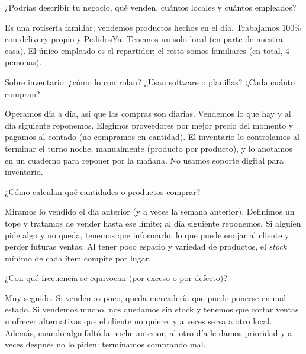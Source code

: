 \begin{description}[leftmargin=0cm, labelsep=0.5cm]

  \item[\textbf{Entrevistador:}] ¿Podrías describir tu negocio, qué venden, cuántos locales y cuántos empleados?

  \item[\textbf{Oscar Campione:}] Es una rotisería familiar; vendemos productos hechos en el día. Trabajamos 100\% con delivery propio y PedidosYa. Tenemos un solo local (en parte de nuestra casa). El único empleado es el repartidor; el resto somos familiares (en total, 4 personas).

  \item[\textbf{Entrevistador:}] Sobre inventario: ¿cómo lo controlan? ¿Usan software o planillas? ¿Cada cuánto compran?

  \item[\textbf{Oscar Campione:}] Operamos día a día, así que las compras son diarias. Vendemos lo que hay y al día siguiente reponemos. Elegimos proveedores por mejor precio del momento y pagamos al contado (no compramos en cantidad). El inventario lo controlamos al terminar el turno noche, manualmente (producto por producto), y lo anotamos en un cuaderno para reponer por la mañana. No usamos soporte digital para inventario.

  \item[\textbf{Entrevistador:}] ¿Cómo calculan qué cantidades o productos comprar?

  \item[\textbf{Oscar Campione:}] Miramos lo vendido el día anterior (y a veces la semana anterior). Definimos un tope y tratamos de vender hasta ese límite; al día siguiente reponemos. Si alguien pide algo y no queda, tenemos que informarlo, lo que puede enojar al cliente y perder futuras ventas. Al tener poco espacio y variedad de productos, el \textit{stock} mínimo de cada ítem compite por lugar.

  \item[\textbf{Entrevistador:}] ¿Con qué frecuencia se equivocan (por exceso o por defecto)?

  \item[\textbf{Oscar Campione:}] Muy seguido. Si vendemos poco, queda mercadería que puede ponerse en mal estado. Si vendemos mucho, nos quedamos sin stock y tenemos que cortar ventas u ofrecer alternativas que el cliente no quiere, y a veces se va a otro local. Además, cuando algo faltó la noche anterior, al otro día le damos prioridad y a veces después no lo piden: terminamos comprando mal.


\end{description}
